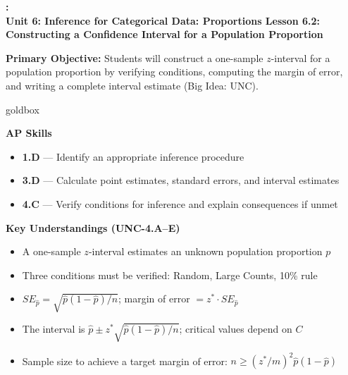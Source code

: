 \documentclass[10pt]{article}
\newcommand{\UnitNumberName}{Unit 6: Inference for Categorical Data: Proportions \quad}
\newcommand{\LessonNumberName}{Lesson 6.2: Constructing a Confidence Interval for a Population Proportion}
\begin{document}
\begin{center}
    {\Large\bfseries \CourseName: \SchoolYear \\
    {\small\bfseries \UnitNumberName \LessonNumberName}}
\end{center}

\begin{tcolorbox}[colback=sky, colframe=navy, boxrule=0.9pt, arc=2mm,
    left=2mm, right=2mm, top=1.5mm, bottom=1.5mm]
    \textbf{Primary Objective:} Students will construct a one-sample $z$-interval for
    a population proportion by verifying conditions, computing the margin of error, and
    writing a complete interval estimate (Big Idea: UNC).
\end{tcolorbox}

\renewcommand{\arraystretch}{1.6}
\begin{skillbox}{goldbox}
    \begin{minipage}[t]{0.48\linewidth}\vspace{0pt}
        \textbf{AP Skills}
        \begin{itemize}[leftmargin=1.2em]
            \item \textbf{1.D} --- Identify an appropriate inference procedure
            \item \textbf{3.D} --- Calculate point estimates, standard errors, and interval estimates
            \item \textbf{4.C} --- Verify conditions for inference and explain consequences if unmet
        \end{itemize}
    \end{minipage}\hfill
    \begin{minipage}[t]{0.48\linewidth}\vspace{0pt}
        \textbf{Key Understandings (UNC-4.A--E)}
        \begin{itemize}[leftmargin=1.2em]
            \item A one-sample $z$-interval estimates an unknown population proportion $p$
            \item Three conditions must be verified: Random, Large Counts, 10\% rule
            \item $SE_{\hat p} = \sqrt{\hat p(1-\hat p)/n}$; margin of error $= z^* \cdot SE_{\hat p}$
            \item The interval is $\hat p \pm z^*\sqrt{\hat p(1-\hat p)/n}$; critical values depend on $C$
            \item Sample size to achieve a target margin of error: $n \ge \left(z^*/m\right)^2 \hat p(1-\hat p)$
        \end{itemize}
    \end{minipage}
\end{skillbox}
\end{document}
